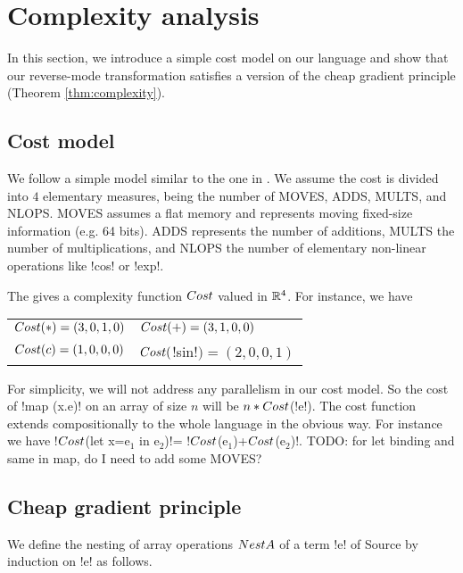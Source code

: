 \section{Complexity analysis}
\label{sec:complexity}

In this section, we introduce a simple cost model on our language and show 
that our reverse-mode transformation satisfies a version of the cheap gradient principle (Theorem \ref{thm:complexity}).

\subsection{Cost model}
\label{sub:costModel}

We follow a simple model similar to the one in \cite{griewank2008evaluating}.
We assume the cost is divided into $4$ elementary measures, being the number of MOVES, ADDS, MULTS, and NLOPS.
MOVES assumes a flat memory and represents moving fixed-size information (e.g. 64 bits). 
ADDS represents the number of additions, 
MULTS the number of multiplications, 
and NLOPS the number of elementary non-linear operations like !cos! or !exp!.

The gives a complexity function $Cost$ valued in $\mathbb{R}^4$. 
For instance, we have 

\begin{tabular}{ll}
    $Cost(*)=(3,0,1,0)$ & $Cost(+)=(3,1,0,0)$\\
    $Cost(c)=(1,0,0,0)$ & $Cost($!sin!$)=(2,0,0,1)$
\end{tabular}

For simplicity, we will not address any parallelism in our cost model. 
So the cost of !map (x.e)! on an array of size $n$ will be $n*Cost$(!e!).
The cost function extends compositionally to the whole language in the obvious way.
For instance we have !$Cost$(let x=e$_1$ in e$_2$)!= !$Cost$(e$_1$)+$Cost$(e$_2$)!.
TODO: for let binding and same in map, do I need to add some MOVES?

\subsection{Cheap gradient principle}

We define the nesting of array operations $NestA$ of a term !e! of Source by induction on !e! as follows.

